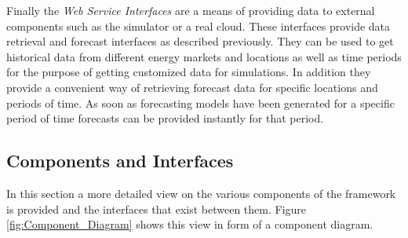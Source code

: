 Finally the \textit{Web Service Interfaces} are a means of providing data to external components such as the simulator or a real cloud. 
These interfaces provide data retrieval and forecast interfaces as described previously. They can be used to get historical data from different energy markets and locations as well as time periods for the purpose of getting customized data for simulations. In addition they provide a convenient way of retrieving forecast data for specific locations and periods of time. As soon as forecasting models have been generated for a specific period of time forecasts can be provided instantly for that period. 



\subsection{Components and Interfaces}

In this section a more detailed view on the various components of the framework is provided and the interfaces that exist between them. Figure \ref{fig:Component_Diagram} shows this view in form of a component diagram. 

